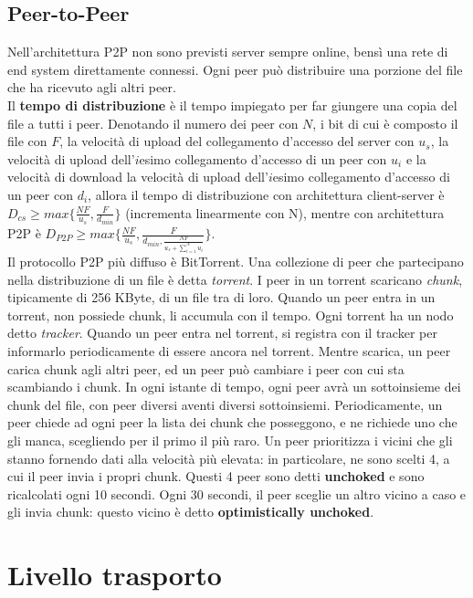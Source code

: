 \documentclass[11pt]{article}
\begin{document}
\subsection{Peer-to-Peer}
Nell'architettura P2P non sono previsti server sempre online, bensì una rete di end system direttamente connessi. Ogni
peer può distribuire una porzione del file che ha ricevuto agli altri peer.\\
Il \textbf{tempo di distribuzione} è il tempo impiegato per far giungere una copia del file a tutti i peer. Denotando 
il numero dei peer con $N$, i bit di cui è composto il file con $F$,
la velocità di upload del collegamento d'accesso del server con $u_s$, la velocità di upload dell'$i$esimo collegamento 
d'accesso di un peer con $u_i$ e la velocità di download la velocità di upload dell'$i$esimo collegamento d'accesso di 
un peer con $d_i$, allora il tempo di distribuzione con architettura client-server è 
$D_{cs} \geq max\{\frac{NF}{u_s}, \frac{F}{d_{min}}\}$ (incrementa linearmente con N), mentre con architettura P2P è
$D_{P2P} \geq max\{\frac{NF}{u_s}, \frac{F}{d_{min}, \frac{NF}{u_{s}+\sum_{i = 1}^{N}u_i}}\}$.\\
Il protocollo P2P più diffuso è BitTorrent. Una collezione di peer che partecipano nella distribuzione di un file è detta
\textit{torrent}. I peer in un torrent scaricano \textit{chunk}, tipicamente di 256 KByte, di un file tra di loro. Quando
un peer entra in un torrent, non possiede chunk, li accumula con il tempo. Ogni torrent ha un nodo detto \textit{tracker}.
Quando un peer entra nel torrent, si registra con il tracker per informarlo periodicamente di essere ancora nel torrent.
Mentre scarica, un peer carica chunk agli altri peer, ed un peer può cambiare i peer con cui sta scambiando i chunk. In
ogni istante di tempo, ogni peer avrà un sottoinsieme dei chunk del file, con peer diversi aventi diversi sottoinsiemi.
Periodicamente, un peer chiede ad ogni peer la lista dei chunk che posseggono, e ne richiede uno che gli manca, scegliendo
per il primo il più raro. Un peer prioritizza i vicini che gli stanno fornendo dati alla velocità più elevata: in
particolare, ne sono scelti 4, a cui il peer invia i propri chunk. Questi 4 peer sono detti \textbf{unchoked} e sono
ricalcolati ogni 10 secondi. Ogni 30 secondi, il peer sceglie un altro vicino a caso e gli invia chunk: questo vicino è
detto \textbf{optimistically unchoked}.
\section{Livello trasporto}
\end{document}
